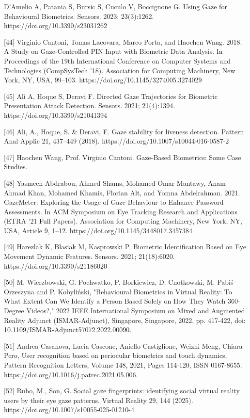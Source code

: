 \documentclass{article}
\begin{document}
\begin{raggedright}
[43] D'Amelio A, Patania S, Bursic S, Cuculo V, Boccignone G. Using Gaze for Behavioural Biometrics. Sensors. 2023; 23(3):1262. https://doi.org/10.3390/s23031262

[44] Virginio Cantoni, Tomas Lacovara, Marco Porta, and Haochen Wang. 2018. A Study on Gaze-Controlled PIN Input with Biometric Data Analysis. In Proceedings of the 19th International Conference on Computer Systems and Technologies (CompSysTech '18). Association for Computing Machinery, New York, NY, USA, 99–103. https://doi.org/10.1145/3274005.3274029

[45] Ali A, Hoque S, Deravi F. Directed Gaze Trajectories for Biometric Presentation Attack Detection. Sensors. 2021; 21(4):1394. https://doi.org/10.3390/s21041394

[46] Ali, A., Hoque, S. \& Deravi, F. Gaze stability for liveness detection. Pattern Anal Applic 21, 437–449 (2018). https://doi.org/10.1007/s10044-016-0587-2

[47] Haochen Wang, Prof. Virginio Cantoni. Gaze-Based Biometrics: Some Case Studies. 

[48] Yasmeen Abdrabou, Ahmed Shams, Mohamed Omar Mantawy, Anam Ahmad Khan, Mohamed Khamis, Florian Alt, and Yomna Abdelrahman. 2021. GazeMeter: Exploring the Usage of Gaze Behaviour to Enhance Password Assessments. In ACM Symposium on Eye Tracking Research and Applications (ETRA '21 Full Papers). Association for Computing Machinery, New York, NY, USA, Article 9, 1–12. https://doi.org/10.1145/3448017.3457384

[49] Harezlak K, Blasiak M, Kasprowski P. Biometric Identification Based on Eye Movement Dynamic Features. Sensors. 2021; 21(18):6020. https://doi.org/10.3390/s21186020

[50] M. Wierzbowski, G. Pochwatko, P. Borkiewicz, D. Cnotkowski, M. Pabiś-Orzeszyna and P. Kobyliński, "Behavioural Biometrics in Virtual Reality: To What Extent Can We Identify a Person Based Solely on How They Watch 360-Degree Videos?," 2022 IEEE International Symposium on Mixed and Augmented Reality Adjunct (ISMAR-Adjunct), Singapore, Singapore, 2022, pp. 417-422, doi: 10.1109/ISMAR-Adjunct57072.2022.00090.

[51] Andrea Casanova, Lucia Cascone, Aniello Castiglione, Weizhi Meng, Chiara Pero, User recognition based on periocular biometrics and touch dynamics, Pattern Recognition Letters, Volume 148, 2021, Pages 114-120, ISSN 0167-8655. https://doi.org/10.1016/j.patrec.2021.05.006.

[52] Rubo, M., Son, G. Social gaze fingerprints: identifying social virtual reality users by their eye gaze patterns. Virtual Reality 29, 144 (2025). https://doi.org/10.1007/s10055-025-01210-4


\end{raggedright}
\end{document}
